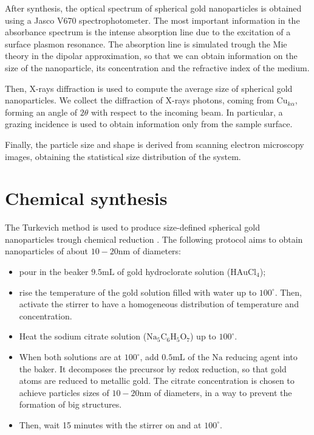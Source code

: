 \documentclass[prb,twocolumn]{revtex4-1}
\begin{document}
After synthesis, the optical spectrum of spherical gold nanoparticles is obtained using a Jasco V670 spectrophotometer. The most important information in the absorbance spectrum is the intense absorption line due to the excitation of a surface plasmon resonance. The absorption line is simulated trough the Mie theory in the dipolar approximation, so that we can obtain information on the size of the nanoparticle, its concentration and the refractive index of the medium.

Then, X-rays diffraction is used to compute the average size of spherical gold nanoparticles. We collect the diffraction of X-rays photons, coming from \(\text{Cu}_{k \alpha}\), forming an angle of \(2\theta\) with respect to the incoming beam. In particular, a grazing incidence is used to obtain information only from the sample surface.

Finally, the particle size and shape is derived from scanning electron microscopy images, obtaining the statistical size distribution of the system. 



\section{Chemical synthesis}
The Turkevich method is used to produce size-defined spherical gold nanoparticles trough chemical reduction \cite{article}. The following protocol aims to obtain nanoparticles of about \(10-20 \text{nm} \) of diameters:

\begin{itemize}
\item pour in the beaker \(9.5\text{mL}\) of gold hydroclorate solution (\( \text{HAuCl}_4\));
\item rise the temperature of the gold solution filled with water up to \(100^\circ\). Then, activate the stirrer to have a homogeneous distribution of temperature and concentration.
\item Heat the sodium citrate solution (\( \text{Na}_5 \text{C}_6 \text{H}_5 \text{O}_7 \)) up to  \(100^\circ\).

\item When both solutions are at  \(100^\circ\), add  \(0.5\text{mL}\) of the \(\text{Na}\) reducing agent into the baker. It decomposes the precursor by redox reduction, so that gold atoms are reduced to metallic gold. The citrate concentration is chosen to achieve particles sizes of \(10-20 \text{nm} \) of diameters, in a way to prevent the formation of big structures.

\item Then, wait 15 minutes with the stirrer on and at \(100^\circ\).
\end{itemize}
\end{document}

